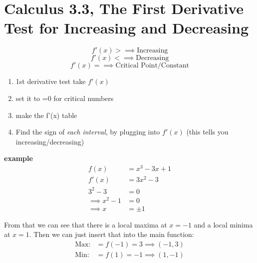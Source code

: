 \documentclass{report}
\begin{document}
\section{Calculus 3.3, The First Derivative Test for Increasing and Decreasing} %
\begin{multicols}{2}
\label{ssub:Calculus 3.3, The First Derivative Test for Increasing and Decreasing}

\begin{tcolorbox}[colback=blue!10!white,colframe=blue!50!black,title=Recall:]
  \[f'(x)> \implies \text{Increasing}\]
  \[f'(x)< \implies \text{Decreasing}\]
  \[f'(x)= \implies \text{Critical Point/Constant}\]
\end{tcolorbox}

\begin{tcolorbox}[colback=red!10!white,colframe=red!50!black,title=How to find relative extrema]
\begin{enumerate}
  \item 1st derivative test
    \subitem take $f'(x)$
  \item set it to =0 for critical numbers
  \item make the f'(x) table
    \begin{center}
      
    \end{center}
  \item Find the sign of \textit{each interval}, by
    plugging into $f'(x)$ (this tells you
    increasing/decreasing)
\end{enumerate}
\end{tcolorbox}

\textbf{example}\\
\begin{align*}
  f(x)&=x^3-3x+1\\
  f'(x)&=3x^2-3\\
  3^2-3&=0\\
  \implies x^2-1&=0\\
  \implies x&=\pm 1
\end{align*}

\begin{center}

\end{center}

From that we can see that there is a local maxima at $x=-1$ and a local minima at $x=1$.
Then we can just insert that into the main function:
\begin{align*}
  \text{Max:}&=f(-1)=3 \implies (-1, 3)\\
  \text{Min:}&=f(1)=-1 \implies (1, -1)\\
\end{align*}


\end{multicols}
\end{document}
